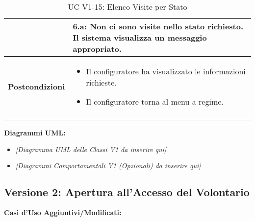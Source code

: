 \documentclass[a4paper,12pt]{article}
\begin{document}
\begin{longtable}{@{} p{} p{} @{}}
                 & \textbf{6.a}: Non ci sono visite nello stato richiesto. Il sistema visualizza un messaggio appropriato. \\
\midrule
\textbf{Postcondizioni} &
\begin{itemize}[leftmargin=*]
    \item Il configuratore ha visualizzato le informazioni richieste.
    \item Il configuratore torna al menu a regime.
\end{itemize} \\
\bottomrule
\caption{UC V1-15: Elenco Visite per Stato} \label{uc:v1-15}
\end{longtable}

\bigskip
\textbf{Diagrammi UML:}
\begin{itemize}
    \item \textit{[Diagramma UML delle Classi V1 da inserire qui]}
    \item \textit{[Diagrammi Comportamentali V1 (Opzionali) da inserire qui]}
\end{itemize}

\newpage
\subsection{Versione 2: Apertura all'Accesso del Volontario}
\textbf{Casi d'Uso Aggiuntivi/Modificati:}
\end{document}
